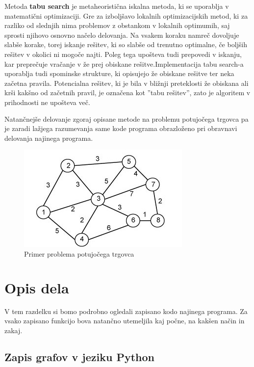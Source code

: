 \documentclass[10pt, a4paper]{article}
\begin{document}
\bigskip
Metoda \textbf{tabu search} je metaheoristična iskalna metoda, ki se uporablja v matematični optimizaciji. Gre za izboljšavo lokalnih optimizacijskih metod, ki za razliko od slednjih nima problemov z obstankom v lokalnih optimumih, saj sprosti njihovo osnovno načelo delovanja. Na vsakem koraku namreč dovoljuje slabše korake, torej iskanje rešitev, ki so slabše od trenutno optimalne, če boljših rešitev v okolici ni mogoče najti. Poleg tega upošteva tudi prepovedi v iskanju, kar preprečuje vračanje v že prej obiskane rešitve.Implementacija tabu search-a uporablja tudi spominske strukture, ki opisujejo že obiskane rešitve ter neka začetna pravila. Potencialna rešitev, ki je bila v bližnji preteklosti že obiskana ali krši kakšno od začetnih pravil, je označena kot ''tabu rešitev'', zato je algoritem v prihodnosti ne upošteva več.

\bigskip
Natančnejše delovanje zgoraj opisane metode na problemu potujočega trgovca pa je zaradi lažjega razumevanja same kode programa obrazloženo pri obravnavi delovanja najinega programa.

\bigskip
\bigskip
\begin{figure}[!h]
\centering
\includegraphics[scale=0.5]{slika1}
\caption{Primer problema potujočega trgovca}
\end{figure}




\section{Opis dela}

V tem razdelku si bomo podrobno ogledali zapisano kodo najinega programa. Za vsako zapisano funkcijo bova natančno utemeljila kaj počne, na kakšen način in zakaj.



\subsection{Zapis grafov v jeziku Python}
\end{document}
